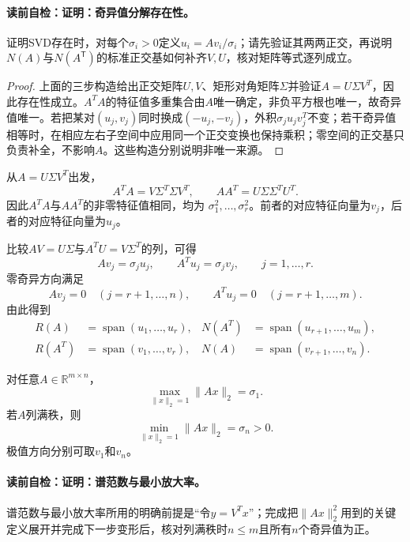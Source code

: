 \label{struct:V4-C03-CH13}
\paragraph{读前自检：证明：奇异值分解存在性。}证明SVD存在时，对每个$\sigma_i>0$定义$u_i=Av_i/\sigma_i$；请先验证其两两正交，再说明$N(A)$与$N(A^{\mathsf T})$的标准正交基如何补齐$V,U$，核对矩阵等式逐列成立。\par

\begin{proof}
上面的三步构造给出正交矩阵$U,V$、矩形对角矩阵$\Sigma$并验证$A=U\Sigma V^T$，因此存在性成立。$A^TA$的特征值多重集合由$A$唯一确定，非负平方根也唯一，故奇异值唯一。若把某对$(u_j,v_j)$同时换成$(-u_j,-v_j)$，外积$\sigma_ju_jv_j^T$不变；若干奇异值相等时，在相应左右子空间中应用同一个正交变换也保持乘积；零空间的正交基只负责补全，不影响$A$。这些构造分别说明非唯一来源。
\end{proof}

从$A=U\Sigma V^T$出发，
\[
A^TA=V\Sigma^T\Sigma V^T,\qquad
AA^T=U\Sigma\Sigma^TU^T.
\]
因此$A^TA$与$AA^T$的非零特征值相同，均为
$\sigma_1^2,\ldots,\sigma_r^2$。前者的对应特征向量为$v_j$，后者的对应特征向量为$u_j$。

比较$AV=U\Sigma$与$A^TU=V\Sigma^T$的列，可得
\[
Av_j=\sigma_ju_j,\qquad
A^Tu_j=\sigma_jv_j,\qquad j=1,\ldots,r.
\]
零奇异方向满足
\[
Av_j=0\quad(j=r+1,\ldots,n),\qquad
A^Tu_j=0\quad(j=r+1,\ldots,m).
\]
由此得到
\[
\begin{aligned}
R(A)&=\operatorname{span}(u_1,\ldots,u_r),&
N(A^T)&=\operatorname{span}(u_{r+1},\ldots,u_m),\\
R(A^T)&=\operatorname{span}(v_1,\ldots,v_r),&
N(A)&=\operatorname{span}(v_{r+1},\ldots,v_n).
\end{aligned}
\]

\begin{theorem}[谱范数与最小放大率]\label{thm:V4-C03-singular-extrema}
对任意$A\in\mathbb R^{m\times n}$，
\[
\max_{\|x\|_2=1}\|Ax\|_2=\sigma_1.
\]
若$A$列满秩，则
\[
\min_{\|x\|_2=1}\|Ax\|_2=\sigma_n>0.
\]
极值方向分别可取$v_1$和$v_n$。
\end{theorem}
\paragraph{读前自检：证明：谱范数与最小放大率。}谱范数与最小放大率所用的明确前提是“令$y=V^Tx$”；完成把$\|Ax\|_2^2$用到的关键定义展开并完成下一步变形后，核对列满秩时$n\leq m$且所有$n$个奇异值为正。\par

